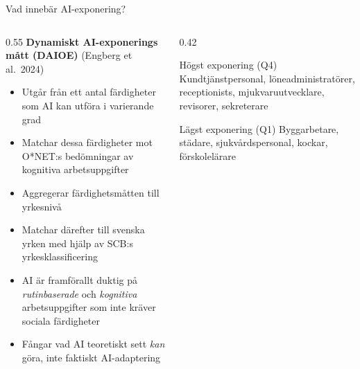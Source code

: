\documentclass[aspectratio=169,11pt]{beamer}
\begin{document}
\begin{frame}{Vad innebär AI-exponering?}
\begin{columns}[T]
\begin{column}{0.55\textwidth}
\textbf{Dynamiskt AI-exponerings mått (DAIOE)} (Engberg et al.\ 2024)
\begin{enumerate}
  \begin{itemize}
    \item Utgår från ett antal färdigheter som AI kan utföra i varierande grad
    
    \item Matchar dessa färdigheter mot O*NET:s bedömningar av kognitiva arbetsuppgifter
    
    \item Aggregerar färdighetsmåtten till yrkesnivå
    
    \item Matchar därefter till svenska yrken med hjälp av SCB:s yrkesklassificering

    \item AI är framförallt duktig på \textit{rutinbaserade} och \textit{kognitiva} arbetsuppgifter som inte kräver sociala färdigheter
\end{itemize}
\end{enumerate}
\vspace{2mm}
\begin{itemize}
    \item Fångar vad AI teoretiskt sett \textit{kan} göra, inte faktiskt AI-adaptering
\end{itemize}
\end{column}
\begin{column}{0.42\textwidth}
\begin{block}{Högst exponering (Q4)}
\footnotesize
Kundtjänstpersonal, löneadministratörer, receptionists, mjukvaruutvecklare, revisorer, sekreterare
\end{block}
\vspace{2mm}
\begin{block}{Lägst exponering (Q1)}
\footnotesize
Byggarbetare, städare, sjukvårdspersonal, kockar, förskolelärare
\end{block}
\end{column}
\end{columns}
\hypertarget{main:daioe}{}
\end{frame}
\end{document}
